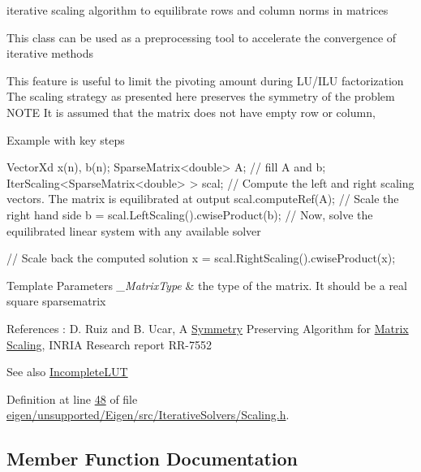 iterative scaling algorithm to equilibrate rows and column norms in matrices 

This class can be used as a preprocessing tool to accelerate the convergence of iterative methods

This feature is useful to limit the pivoting amount during L\+U/\+I\+LU factorization The scaling strategy as presented here preserves the symmetry of the problem N\+O\+TE It is assumed that the matrix does not have empty row or column,

Example with key steps 
\begin{DoxyCode}
VectorXd x(n), b(n);
SparseMatrix<double> A;
\textcolor{comment}{// fill A and b;}
IterScaling<SparseMatrix<double> > scal; 
\textcolor{comment}{// Compute the left and right scaling vectors. The matrix is equilibrated at output}
scal.computeRef(A); 
\textcolor{comment}{// Scale the right hand side}
b = scal.LeftScaling().cwiseProduct(b); 
\textcolor{comment}{// Now, solve the equilibrated linear system with any available solver}

\textcolor{comment}{// Scale back the computed solution}
x = scal.RightScaling().cwiseProduct(x); 
\end{DoxyCode}



\begin{DoxyTemplParams}{Template Parameters}
{\em \+\_\+\+Matrix\+Type} & the type of the matrix. It should be a real square sparsematrix\\
\hline
\end{DoxyTemplParams}
References \+: D. Ruiz and B. Ucar, A \hyperlink{struct_eigen_1_1_symmetry}{Symmetry} Preserving Algorithm for \hyperlink{group___core___module_class_eigen_1_1_matrix}{Matrix} \hyperlink{class_scaling}{Scaling}, I\+N\+R\+IA Research report R\+R-\/7552

\begin{DoxySeeAlso}{See also}
\hyperlink{group___iterative_linear_solvers___module}{Incomplete\+L\+UT} 
\end{DoxySeeAlso}


Definition at line \hyperlink{eigen_2unsupported_2_eigen_2src_2_iterative_solvers_2_scaling_8h_source_l00048}{48} of file \hyperlink{eigen_2unsupported_2_eigen_2src_2_iterative_solvers_2_scaling_8h_source}{eigen/unsupported/\+Eigen/src/\+Iterative\+Solvers/\+Scaling.\+h}.



\subsection{Member Function Documentation}
\mbox{\label{class_eigen_1_1_iter_scaling_a6a76754399fd004b3ac6011e272ffb71}} 
